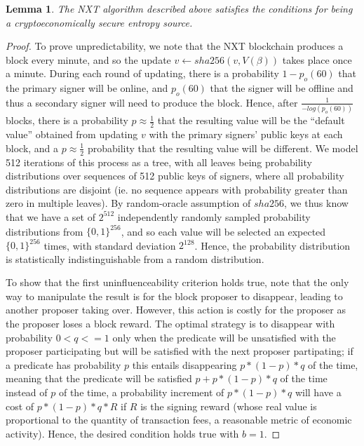 \documentclass[11pt,a4paper]{article}
\theoremstyle{plain}
\newtheorem{lem}[thm]{Lemma}
\theoremstyle{definition}
\theoremstyle{remark}
\begin{document}
\begin{lem}
The NXT algorithm described above satisfies the conditions for being a cryptoeconomically secure entropy source.
\end{lem}
\begin{proof}
To prove unpredictability, we note that the NXT blockchain produces a block every minute, and so the update $v \leftarrow sha256(v, V(\beta))$ takes place once a minute. During each round of updating, there is a probability $1 - p_o(60)$ that the primary signer will be online, and $p_o(60)$ that the signer will be offline and thus a secondary signer will need to produce the block. Hence, after $\frac{1}{-log(p_o(60))}$ blocks, there is a probability $p \approx \frac{1}{2}$ that the resulting value will be the ``default value'' obtained from updating $v$ with the primary signers' public keys at each block, and a $p \approx \frac{1}{2}$ probability that the resulting value will be different. We model 512 iterations of this process as a tree, with all leaves being probability distributions over sequences of 512 public keys of signers, where all probability distributions are disjoint (ie. no sequence appears with probability greater than zero in multiple leaves). By random-oracle assumption of $sha256$, we thus know that we have a set of $2^{512}$ independently randomly sampled probability distributions from $\{0,1\}^{256}$, and so each value will be selected an expected $\{0,1\}^{256}$ times, with standard deviation $2^{128}$. Hence, the probability distribution is statistically indistinguishable from a random distribution.
 
To show that the first uninfluenceability criterion holds true, note that the only way to manipulate the result is for the block proposer to disappear, leading to another proposer taking over. However, this action is costly for the proposer as the proposer loses a block reward. The optimal strategy is to disappear with probability $0 < q <= 1$ only when the predicate will be unsatisfied with the proposer participating but will be satisfied with the next proposer partipating; if a predicate has probability $p$ this entails disappearing $p * (1-p) * q$ of the time, meaning that the predicate will be satisfied $p + p * (1-p) * q$ of the time instead of $p$ of the time, a probability increment of $p * (1-p) * q$ will have a cost of $p * (1-p) * q * R$ if $R$ is the signing reward (whose real value is proportional to the quantity of transaction fees, a reasonable metric of economic activity). Hence, the desired condition holds true with $b = 1$.


\end{proof}
\end{document}
